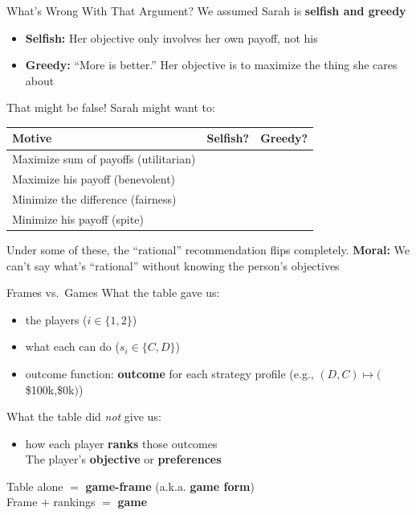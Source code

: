 \begin{frame}{What's Wrong With That Argument?}
We assumed Sarah is \textbf{selfish and greedy}
\begin{itemize}
    \item \textbf{Selfish:} Her objective only involves her own payoff, not his
    \item \textbf{Greedy:} ``More is better.'' Her objective is to maximize the thing she cares about
\end{itemize}
\bsk
That might be false! Sarah might want to:
\begin{tabular}{|l|c|c|}
     \hline
     \textbf{Motive} & \textbf{Selfish?} & \textbf{Greedy?}  \\
     \hline
     Maximize sum of payoffs (utilitarian) & & \\
     \hline
     Maximize his payoff (benevolent) & & \\
     \hline
     Minimize the difference (fairness) & & \\
     \hline
     Minimize his payoff (spite) & & \\
     \hline
\end{tabular}
\bsk
Under some of these, the ``rational'' recommendation flips completely.
\vfill
\textbf{Moral:} We can't say what's ``rational'' without knowing the person's objectives
\vspace{-0.4in}
\end{frame}


\begin{frame}{Frames vs.\ Games}
What the table gave us:
\begin{itemize}
    \item the players ($i\in \{1,2\}$)
    \item what each can do ($s_i\in \{C,D\}$)
    \item outcome function: \textbf{outcome} for each strategy profile (e.g., $(D,C)\mapsto($\$100k,\$0k$)$)
\end{itemize}
\bsk
What the table did \textit{not} give us:
\begin{itemize}
    \item how each player \textbf{ranks} those outcomes\\
    The player's \textbf{objective} or \textbf{preferences}
\end{itemize}
\vfill
\centering
\large
Table alone $=$ \textbf{game-frame} (a.k.a. \textbf{game form})\\
\bsk
Frame $+$ rankings $=$ \textbf{game}
\vfill
\end{frame}

